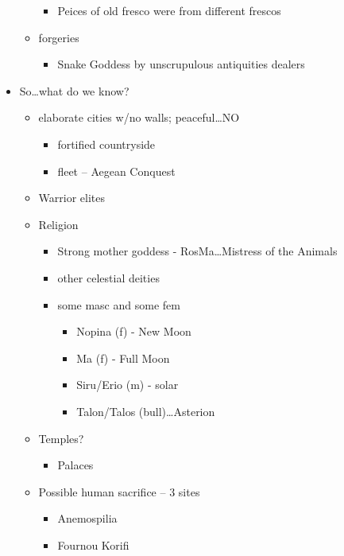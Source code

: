 \documentclass[11pt, a4paper]{article}
\begin{document}
\begin{itemize}
\begin{itemize}
        \begin{itemize}
          \item Peices of old fresco were from different frescos
        \end{itemize}
      \item forgeries
        \begin{itemize}
          \item Snake Goddess by unscrupulous antiquities dealers
        \end{itemize}
    \end{itemize}
  \item So\dots what do we know?
    \begin{itemize}
      \item elaborate cities w/no walls; peaceful\dots NO
        \begin{itemize}
          \item fortified countryside
          \item fleet -- Aegean Conquest
        \end{itemize}
      \item Warrior elites
      \item Religion
        \begin{itemize}
          \item Strong mother goddess - RosMa\dots Mistress of the Animals
          \item other celestial deities
          \item some masc and some fem
            \begin{itemize}
              \item Nopina (f) - New Moon
              \item Ma (f) - Full Moon
              \item Siru/Erio (m) - solar
              \item Talon/Talos (bull)\dots Asterion
            \end{itemize}
        \end{itemize}
      \item Temples?
        \begin{itemize}
          \item Palaces
        \end{itemize}
      \item Possible human sacrifice -- 3 sites
        \begin{itemize}
          \item Anemospilia
          \item Fournou Korifi

\end{itemize}
\end{itemize}
\end{itemize}
\end{document}
